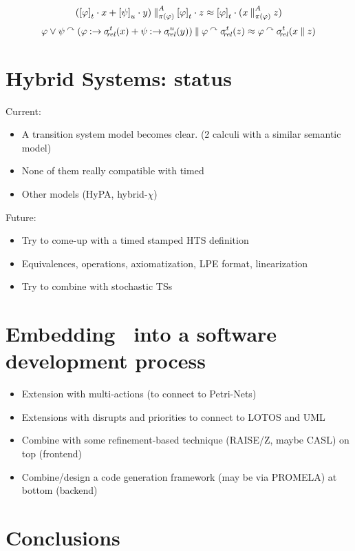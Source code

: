 \begin{slide}
\[(\left[ {\varphi} \right]_{t}\mathbin{\cdot} x+\left[ {\psi} \right]_{u}\mathbin{\cdot} y)\mathbin{\parallel}^A_{\pi(\varphi)}\left[ {\varphi} \right]_{t}\mathbin{\cdot} z\approx \left[ {\varphi} \right]_{t}\mathbin{\cdot} (x\mathbin{\parallel}^A_{\pi(\varphi)} z)\]
\[\varphi\vee\psi\csins(\varphi\cond\delay{t}(x)+\psi\cond\delay{u}(y))\parc\varphi\csins\delay{t}(z)\id \varphi\csins\delay{t}(x\parc z)\] 
\newslide\section*{Hybrid Systems: status}
Current:
\begin{itemize}
\item A transition system model becomes clear. (2 calculi with a similar semantic model)
\item None of them really compatible with timed \mcrl
\item Other models (HyPA, hybrid-$\chi$)
\end{itemize}
\pause
Future:
\begin{itemize}
\item Try to come-up with a timed stamped HTS definition
\item Equivalences, operations, axiomatization, LPE format, linearization
\item Try to combine with stochastic TSs
\end{itemize}
\newslide\section*{Embedding \mcrl\ into a software development process}
\begin{itemize}
\item Extension with multi-actions (to connect to Petri-Nets)
\item Extensions with disrupts and priorities to connect to LOTOS and UML
\item Combine with some refinement-based technique (RAISE/Z, maybe CASL) on top (frontend)
\item Combine/design a code generation framework (may be via PROMELA) at bottom (backend)
\end{itemize}
\newslide\section*{Conclusions}

\end{slide}
